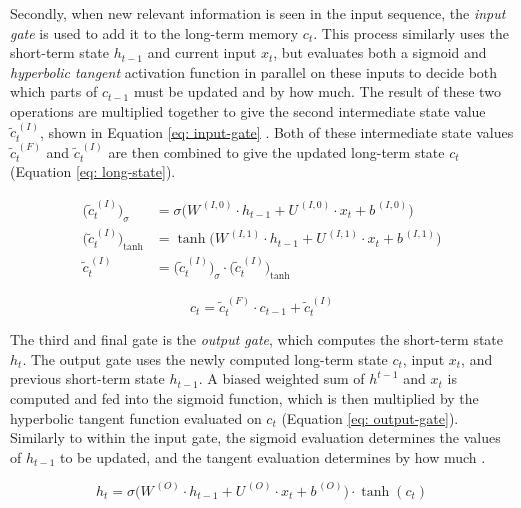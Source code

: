 \documentclass[a4paper, 11pt]{report}
\begin{document}
    Secondly, when new relevant information is seen in the input sequence, the \emph{input gate} is used to add it to the long-term memory $c_t$. This process similarly uses the short-term state $h_{t-1}$ and current input $x_t$, but evaluates both a sigmoid and \emph{hyperbolic tangent} activation function in parallel on these inputs to decide both which parts of $c_{t-1}$ must be updated and by how much. The result of these two operations are multiplied together to give the second intermediate state value $\tilde{c}^{\,(I)}_t$, shown in Equation \ref{eq: input-gate} \citep{zhang-2021}. Both of these intermediate state values $\tilde{c}^{\,(F)}_t$ and $\tilde{c}^{\,(I)}_t$ are then combined to give the updated long-term state $c_t$ (Equation \ref{eq: long-state}).

    \begin{align}
        \label{eq: input-gate}
        \Big( \tilde{c}^{\,(I)}_t \Big)_{\sigma} &= \sigma \Big( W^{\,(I,0)} \cdot h_{t-1} + U^{\,(I,0)} \cdot x_t + b^{\,(I,0)} \Big) \\
        \Big( \tilde{c}^{\,(I)}_t \Big)_{\tanh} &= \tanh{\Big( W^{\,(I,1)} \cdot h_{t-1} + U^{\,(I,1)} \cdot x_t + b^{\,(I,1)} \Big)} \\
        \tilde{c}^{\,(I)}_t &= \Big( \tilde{c}^{\,(I)}_t \Big)_{\sigma} \cdot \Big( \tilde{c}^{\,(I)}_t \Big)_{\tanh}
    \end{align}

    \begin{equation}
        \label{eq: long-state}
        c_t = \tilde{c}^{\,(F)}_t \cdot c_{t-1} + \tilde{c}^{\,(I)}_t
    \end{equation}

    The third and final gate is the \emph{output gate}, which computes the short-term state $h_t$. The output gate uses the newly computed long-term state $c_t$, input $x_t$, and previous short-term state $h_{t-1}$. A biased weighted sum of $h^{t-1}$ and $x_t$ is computed and fed into the sigmoid function, which is then multiplied by the hyperbolic tangent function evaluated on $c_t$ (Equation \ref{eq: output-gate}). Similarly to within the input gate, the sigmoid evaluation determines the values of $h_{t-1}$ to be updated, and the tangent evaluation determines by how much \citep{zhang-2021}.

    \begin{equation}
        \label{eq: output-gate}
        h_t = \sigma \Big( W^{\,(O)} \cdot h_{t-1} + U^{\,(O)} \cdot x_t + b^{\,(O)} \Big) \cdot \tanh{( c_t )}
    \end{equation}
\end{document}
